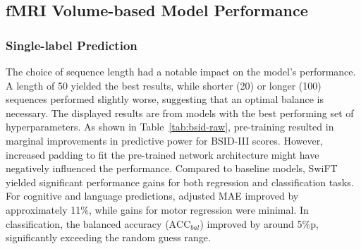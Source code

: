 \documentclass[runningheads,a4paper]{llncs}
\begin{document}
\begin{table}[h]
\begin{minipage}{0.4\textwidth}
\vspace{.3em}

\end{minipage}

\end{table}


\subsection{fMRI Volume-based Model Performance}

\subsubsection{Single-label Prediction}

The choice of sequence length had a notable impact on the model's performance. A length of 50 yielded the best results, while shorter (20) or longer (100) sequences performed slightly worse, suggesting that an optimal balance is necessary. The displayed results are from models with the best performing set of hyperparameters.
%
As shown in Table~\ref{tab:bsid-raw}, pre-training resulted in marginal improvements in predictive power for BSID-III scores. However, increased padding to fit the pre-trained network architecture might have negatively influenced the performance. Compared to baseline models, SwiFT yielded significant performance gains for both regression and classification tasks. For cognitive and language predictions, adjusted MAE improved by approximately 11\%, while gains for motor regression were minimal. In classification, the balanced accuracy ($\text{ACC}_{bal}$) improved by around 5\%p, significantly exceeding the random guess range.
\end{document}
